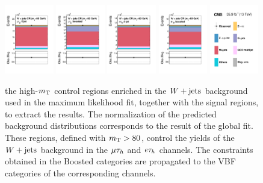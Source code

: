 \begin{figure}[!htbp]
\centering
     \includegraphics[width=0.19\textwidth]{higgs_to_taus/plots/Figure_002-a.pdf}
     \includegraphics[width=0.19\textwidth]{higgs_to_taus/plots/Figure_002-b.pdf}
     \includegraphics[width=0.19\textwidth]{higgs_to_taus/plots/Figure_002-c.pdf}
     \includegraphics[width=0.19\textwidth]{higgs_to_taus/plots/Figure_002-d.pdf}
     \includegraphics[width=0.19\textwidth]{higgs_to_taus/plots/Figure_002-e.pdf}
     \caption{the high-$m_\mathrm{T}$ control regions enriched in the $W+\text{jets}$ background used in 
the maximum likelihood fit, together with the signal regions, to extract the results. 
The normalization of the predicted background distributions corresponds to the result of 
the global fit. These regions, defined with $m_\mathrm{T}>80$\GeV, control the yields of the 
$W+\text{jets}$ background in the $\mu\tau_{h}$ and $e\tau_{h}$ channels.  
The constraints obtained in the Boosted categories are propagated to the VBF categories 
of the corresponding channels.}
     \label{fig:htt_wj_CR1}
\end{figure}


